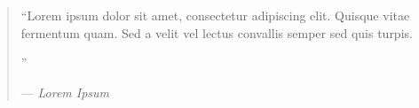 %
\cleardoublepage
\thispagestyle{empty}

\begin{quote}
\noindent``Lorem ipsum dolor sit amet, consectetur adipiscing elit. Quisque vitae fermentum quam. Sed a velit vel lectus convallis semper sed quis turpis.

''
	
--- \emph{Lorem Ipsum}
\end{quote}

\clearemptydoublepage